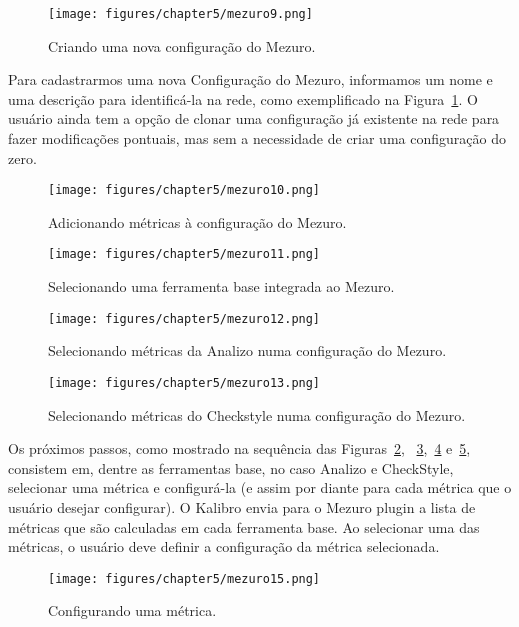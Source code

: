 \begin{figure}[!h]
\centering
\texttt{[image: figures/chapter5/mezuro9.png]}
\caption{Criando uma nova configuração do Mezuro.}
\label{mezuro9}
\end{figure}

Para cadastrarmos uma nova Configuração do Mezuro, informamos um nome e uma
descrição para identificá-la na rede, como exemplificado
na Figura~\ref{mezuro9}.
%
O usuário ainda tem a opção de clonar uma configuração já existente na
rede para fazer modificações pontuais, mas sem a necessidade de criar uma
configuração do zero. 

\begin{figure}[!h]
\centering
\texttt{[image: figures/chapter5/mezuro10.png]}
\caption{Adicionando métricas à configuração do Mezuro.}
\label{mezuro10}
\end{figure}


\begin{figure}[!h]
\centering
\texttt{[image: figures/chapter5/mezuro11.png]}
\caption{Selecionando uma ferramenta base integrada ao Mezuro.}
\label{mezuro11}
\end{figure}


\begin{figure}[!h]
\centering
\texttt{[image: figures/chapter5/mezuro12.png]}
\caption{Selecionando métricas da Analizo numa configuração do Mezuro.}
\label{mezuro12}
\end{figure}


\begin{figure}[!h]
\centering
\texttt{[image: figures/chapter5/mezuro13.png]}
\caption{Selecionando métricas do Checkstyle numa configuração do Mezuro.}
\label{mezuro13}
\end{figure}

Os próximos passos, como mostrado na sequência das Figuras~\ref{mezuro10},
~\ref{mezuro11},~\ref{mezuro12} e~\ref{mezuro13}, consistem em, dentre as
ferramentas base, no caso Analizo e CheckStyle, selecionar uma métrica e
configurá-la (e assim por diante para cada métrica que o usuário desejar configurar).
%
O Kalibro envia para o Mezuro plugin a lista de métricas que são calculadas
em cada ferramenta base. Ao selecionar uma das métricas, o usuário deve
definir a configuração da métrica selecionada.

\begin{figure}[!h]
\centering
\texttt{[image: figures/chapter5/mezuro15.png]}
\caption{Configurando uma métrica.}
\label{mezuro15}
\end{figure}

